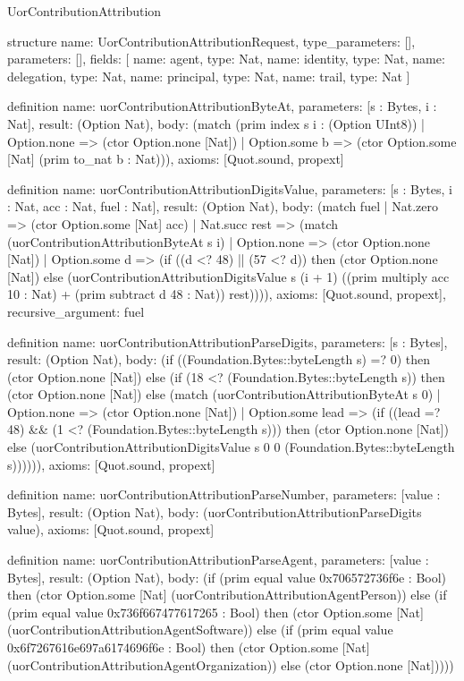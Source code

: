 \begin{lexlean}{UorContributionAttribution}
\begin{semanticmodule}
structure{
  name: UorContributionAttributionRequest,
  type_parameters: [],
  parameters: [],
  fields: [
    {name: agent, type: Nat},
    {name: identity, type: Nat},
    {name: delegation, type: Nat},
    {name: principal, type: Nat},
    {name: trail, type: Nat}
  ]
}

definition{
  name: uorContributionAttributionByteAt,
  parameters: [s : Bytes, i : Nat],
  result: (Option Nat),
  body: (match (prim index s i : (Option UInt8))
    | Option.none => (ctor Option.none [Nat])
    | Option.some b => (ctor Option.some [Nat] (prim to_nat b : Nat))),
  axioms: [Quot.sound, propext]
}

definition{
  name: uorContributionAttributionDigitsValue,
  parameters: [s : Bytes, i : Nat, acc : Nat, fuel : Nat],
  result: (Option Nat),
  body: (match fuel
    | Nat.zero => (ctor Option.some [Nat] acc)
    | Nat.succ rest => (match (uorContributionAttributionByteAt s i)
      | Option.none => (ctor Option.none [Nat])
      | Option.some d => (if ((d <? 48) || (57 <? d)) then (ctor Option.none [Nat]) else (uorContributionAttributionDigitsValue s (i + 1) ((prim multiply acc 10 : Nat) + (prim subtract d 48 : Nat)) rest)))),
  axioms: [Quot.sound, propext],
  recursive_argument: fuel
}

definition{
  name: uorContributionAttributionParseDigits,
  parameters: [s : Bytes],
  result: (Option Nat),
  body: (if ((Foundation.Bytes::byteLength s) =? 0) then (ctor Option.none [Nat]) else (if (18 <? (Foundation.Bytes::byteLength s)) then (ctor Option.none [Nat]) else (match (uorContributionAttributionByteAt s 0)
    | Option.none => (ctor Option.none [Nat])
    | Option.some lead => (if ((lead =? 48) && (1 <? (Foundation.Bytes::byteLength s))) then (ctor Option.none [Nat]) else (uorContributionAttributionDigitsValue s 0 0 (Foundation.Bytes::byteLength s)))))),
  axioms: [Quot.sound, propext]
}

definition{
  name: uorContributionAttributionParseNumber,
  parameters: [value : Bytes],
  result: (Option Nat),
  body: (uorContributionAttributionParseDigits value),
  axioms: [Quot.sound, propext]
}

definition{
  name: uorContributionAttributionParseAgent,
  parameters: [value : Bytes],
  result: (Option Nat),
  body: (if (prim equal value 0x706572736f6e : Bool) then (ctor Option.some [Nat] (uorContributionAttributionAgentPerson)) else (if (prim equal value 0x736f667477617265 : Bool) then (ctor Option.some [Nat] (uorContributionAttributionAgentSoftware)) else (if (prim equal value 0x6f7267616e697a6174696f6e : Bool) then (ctor Option.some [Nat] (uorContributionAttributionAgentOrganization)) else (ctor Option.none [Nat]))))
}


\end{semanticmodule}
\end{lexlean}
